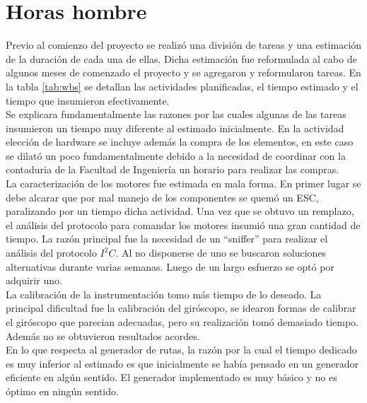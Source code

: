 \documentclass[main]{subfiles}
\begin{document}
\section{Horas hombre}
Previo al comienzo del proyecto se realiz\'o una divisi\'on de tareas y una estimaci\'on de la duraci\'on de cada una de ellas. Dicha estimaci\'on fue reformulada al cabo de algunos meses de comenzado el proyecto y se agregaron y reformularon tareas. En la tabla \ref{tab:wbs} se detallan las actividades planificadas, el tiempo estimado y el tiempo que insumieron efectivamente.\\

Se explicara fundamentalmente las razones por las cuales algunas de las tareas insumieron un tiempo muy diferente al estimado inicialmente. En la actividad elecci\'on de hardware se incluye adem\'as la compra de los elementos, en este caso se dilat\'o un poco fundamentalmente debido a la necesidad de coordinar con la contaduria de la Facultad de Ingenier\'ia un horario para realizar las compras.\\

La caracterizaci\'on de los motores fue estimada en mala forma. En primer lugar se debe alcarar que por mal manejo de los componentes se quem\'o un ESC, paralizando por un tiempo dicha actividad. Una vez que se obtuvo un remplazo, el an\'alisis del protocolo para comandar los motores insumi\'o una gran cantidad de tiempo. La raz\'on principal fue la necesidad de un ``sniffer'' para realizar el an\'alisis del protocolo $I^2C$. Al no disponerse de uno se buscaron soluciones alternativas durante varias semanas. Luego de un largo esfuerzo se opt\'o por adquirir uno.\\

La calibraci\'on de la instrumentaci\'on tomo m\'as tiempo de lo deseado. La principal dificultad fue la calibraci\'on del gir\'oscopo, se idearon formas de calibrar el gir\'oscopo que parecian adecuadas, pero su realizaci\'on tom\'o demasiado tiempo. Adem\'as no se obtuvieron resultados acordes.\\

En lo que respecta al generador de rutas, la raz\'on por la cual el tiempo dedicado es muy inferior al estimado es que inicialmente se hab\'ia pensado en un generador eficiente en alg\'un sentido. El generador implementado es muy b\'asico y no es \'optimo en ning\'un sentido.\\
\end{document}
